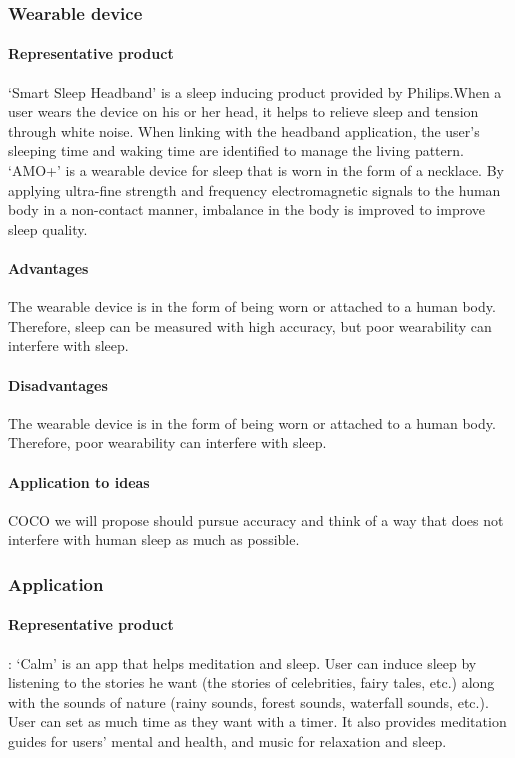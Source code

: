 \documentclass[conference]{IEEEtran}
\begin{document}
\subsubsection{Wearable device}
\paragraph{Representative product}
‘Smart Sleep Headband’ is a sleep inducing product provided by Philips.When a user wears the device on his or her head, it helps to relieve sleep and tension through white noise. When linking with the headband application, the user's sleeping time and waking time are identified to manage the living pattern.
\\
‘AMO+’ is a wearable device for sleep that is worn in the form of a necklace. By applying ultra-fine strength and frequency electromagnetic signals to the human body in a non-contact manner, imbalance in the body is improved to improve sleep quality.
\paragraph{Advantages}
The wearable device is in the form of being worn or attached to a human body. Therefore, sleep can be measured with high accuracy, but poor wearability can interfere with sleep.
\paragraph{Disadvantages}
The wearable device is in the form of being worn or attached to a human body. Therefore, poor wearability can interfere with sleep.
\paragraph{Application to ideas}
COCO we will propose should pursue accuracy and think of a way that does not interfere with human sleep as much as possible.
\vspace{1\baselineskip}
\subsubsection{Application}
\paragraph{Representative product}
: ‘Calm' is an app that helps meditation and sleep. User can induce sleep by listening to the stories he want (the stories of celebrities, fairy tales, etc.) along with the sounds of nature (rainy sounds, forest sounds, waterfall sounds, etc.). User can set as much time as they want with a timer. It also provides meditation guides for users' mental and health, and music for relaxation and sleep.
\end{document}
